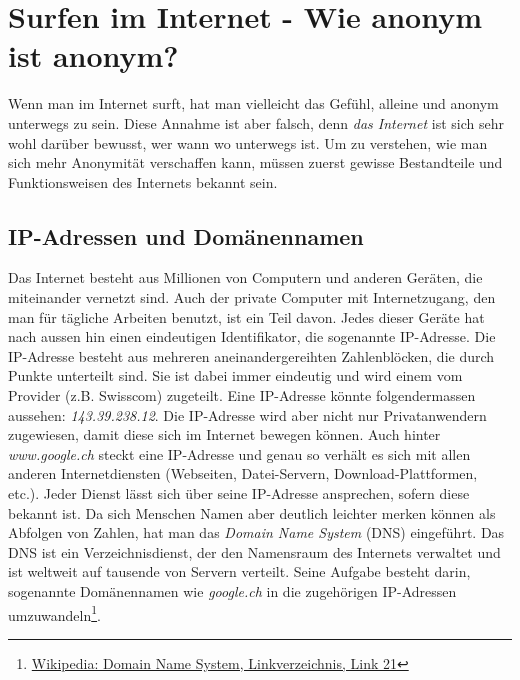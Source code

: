 \section{Surfen im Internet - Wie anonym ist anonym?}
Wenn man im Internet surft, hat man vielleicht das Gefühl, alleine und anonym unterwegs zu sein.
Diese Annahme ist aber falsch, denn \textit{das Internet} ist sich sehr wohl darüber bewusst, wer wann wo unterwegs ist. Um zu verstehen, wie man sich  mehr Anonymität verschaffen kann, müssen zuerst gewisse Bestandteile und Funktionsweisen des Internets bekannt sein.

\subsection{IP-Adressen und Domänennamen}
Das Internet besteht aus Millionen von Computern und anderen Geräten, die miteinander vernetzt sind.
Auch der private Computer mit Internetzugang, den man für tägliche Arbeiten benutzt, ist ein Teil davon.
Jedes dieser Geräte hat nach aussen hin einen eindeutigen Identifikator, die sogenannte IP-Adresse.
Die IP-Adresse besteht aus mehreren aneinandergereihten Zahlenblöcken, die durch Punkte unterteilt sind.
Sie ist dabei immer eindeutig und wird einem vom Provider (z.B. Swisscom) zugeteilt.
Eine IP-Adresse könnte folgendermassen aussehen: \textit{143.39.238.12}.
Die IP-Adresse wird aber nicht nur Privatanwendern zugewiesen, damit diese sich im Internet bewegen können.
Auch hinter \textit{www.google.ch} steckt eine IP-Adresse und genau so verhält es sich mit allen anderen Internetdiensten (Webseiten, Datei-Servern, Download-Plattformen, etc.).
Jeder Dienst lässt sich über seine IP-Adresse ansprechen, sofern diese bekannt ist.
Da sich Menschen Namen aber deutlich leichter merken können als Abfolgen von Zahlen, hat man das \textit{Domain Name System} (DNS) eingeführt.
Das DNS ist ein Verzeichnisdienst, der den Namensraum des Internets verwaltet und ist weltweit auf tausende von Servern verteilt.
Seine Aufgabe besteht darin, sogenannte Domänennamen wie \textit{google.ch} in die zugehörigen IP-Adressen umzuwandeln\footnote{\hyperlink{link21}{Wikipedia: Domain Name System, Linkverzeichnis, Link 21}}.

